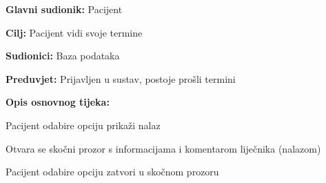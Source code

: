 			
				
				\noindent {}
				\begin{packed_item}
					
					\item \textbf{Glavni sudionik: }Pacijent
					\item  \textbf{Cilj: }Pacijent vidi svoje termine
					\item  \textbf{Sudionici: }Baza podataka
					\item  \textbf{Preduvjet: }Prijavljen u sustav, postoje prošli termini
					\item  \textbf{Opis osnovnog tijeka: }
					
					\item[] \begin{packed_enum}
						
						\item Pacijent odabire opciju prikaži nalaz
						\item Otvara se skočni prozor s informacijama i komentarom liječnika (nalazom)
						\item Pacijent odabire opciju zatvori u skočnom prozoru
					\end{packed_enum}
				\end{packed_item}
				
